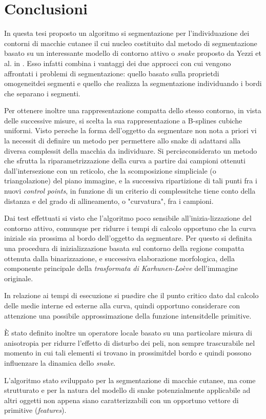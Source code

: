 \chapter{Conclusioni}

In questa tesi \e proposto un algoritmo si segmentazione per l'individuazione dei contorni
di macchie cutanee il cui nucleo \e costituito dal metodo di segmentazione basato su un
interessante modello di contorno attivo o {\it snake} proposto da Yezzi et al. in \cite{Yezzi}.
Esso infatti combina i vantaggi dei due approcci con cui vengono affrontati i problemi di
segmentazione: quello basato sulla propriet\a di omogeneit\a dei segmenti e quello che
realizza la segmentazione individuando i bordi che separano i segmenti.

Per ottenere inoltre una rappresentazione compatta dello stesso contorno, in vista delle
successive misure, si \e scelta la sua rappresentazione a B-splines cubiche uniformi.
Visto per\o che la forma dell'oggetto da segmentare non \e nota a priori vi \e la necessit\a
di definire un metodo per permettere allo snake di adattarsi alla diversa complessit\a
della macchia da individuare.
Si \e perci\o considerato un metodo che sfrutta la riparametrizzazione della curva a partire
dai campioni ottenuti dall'intersezione con un reticolo, che \e la scomposizione simpliciale 
(o triangolazione) del piano immagine, e la successiva ripartizione di tali punti fra
i nuovi {\it control points}, in funzione di un criterio di complessit\a che tiene conto della
distanza e del grado di allineamento, o "curvatura", fra i campioni.

Dai test effettuati si \e visto che l'algoritmo \e poco sensibile
all'inizia-lizzazione del contorno attivo, comunque per ridurre i tempi di calcolo \e opportuno
che la curva iniziale sia prossima al bordo dell'oggetto da segmentare.
Per questo si \e
definita una procedura di inizializzazione basata sul contorno della regione compatta ottenuta
dalla binarizzazione, e successiva elaborazione morfologica, della componente principale della
{\it trasformata di Karhunen-Lo\`eve} dell'immagine originale.

In relazione ai tempi di esecuzione si pu\o dire che il punto critico \e dato dal calcolo delle
medie interne ed esterne alla curva, \e quindi opportuno considerare con attenzione una 
possibile approssimazione della funzione intensit\a delle primitive.

\`E stato definito inoltre un operatore locale basato su una particolare misura di anisotropia
per ridurre l'effetto di disturbo dei peli, non sempre 
trascurabile nel momento in cui tali elementi si trovano in prossimit\a del bordo e quindi
possono influenzare la dinamica dello {\it snake}.

L'algoritmo \e stato sviluppato per la segmentazione di macchie cutanee, ma come \e
strutturato e per la natura del modello di snake \e potenzialmente applicabile ad altri
oggetti non appena siano caratterizzabili con un opportuno vettore di primitive ({\it features}).

\finepar
